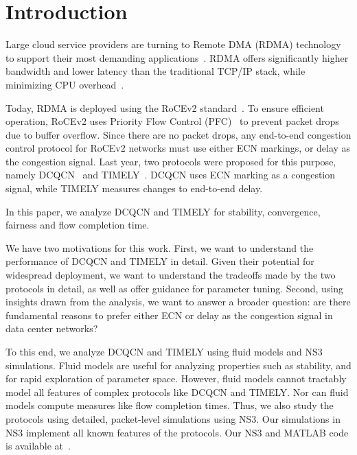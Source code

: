 \section{Introduction}

Large cloud service providers are turning to Remote DMA (RDMA) technology to
support their most demanding applications~\cite{dcqcn,timely,tcp-bolt}.  RDMA
offers significantly higher bandwidth and lower latency than the traditional
TCP/IP stack, while minimizing CPU overhead~\cite{dcqcn,farm,timely}. 

Today, RDMA is deployed using the RoCEv2 standard~\cite{rocev2}. To ensure
efficient operation, RoCEv2 uses Priority Flow Control (PFC)~\cite{pfc} to
prevent packet drops due to buffer overflow.  Since there are no packet drops,
any end-to-end congestion control protocol for RoCEv2 networks must use either
ECN markings, or delay as the congestion signal.  Last year, two protocols were
proposed for this purpose, namely DCQCN~\cite{dcqcn} and TIMELY~\cite{timely}.
DCQCN uses ECN marking as a congestion signal, while TIMELY measures changes to
end-to-end delay.


In this paper, we analyze DCQCN and TIMELY for stability, convergence,
fairness and flow completion time.

We have two motivations for this work. First, we want to understand the
performance of DCQCN and TIMELY in detail. Given their potential for widespread
deployment, we want to understand the tradeoffs made by the two protocols in
detail, as well as offer guidance for parameter tuning.  Second, using insights
drawn from the analysis, we want to answer a broader question: are there
fundamental reasons to prefer either ECN or delay as the congestion signal in
data center networks? 


To this end, we analyze DCQCN and TIMELY using fluid models and NS3~\cite{NS3}
simulations. Fluid models are useful for analyzing properties such as stability,
and for rapid exploration of parameter space. However, fluid models cannot
tractably model all features of complex protocols like DCQCN and TIMELY. Nor can
fluid models compute measures like flow completion times. Thus, we also study
the protocols using detailed, packet-level simulations using NS3. Our
simulations in NS3 implement all known features of the protocols. Our NS3 and
MATLAB code is available at~\cite{xxx}.


